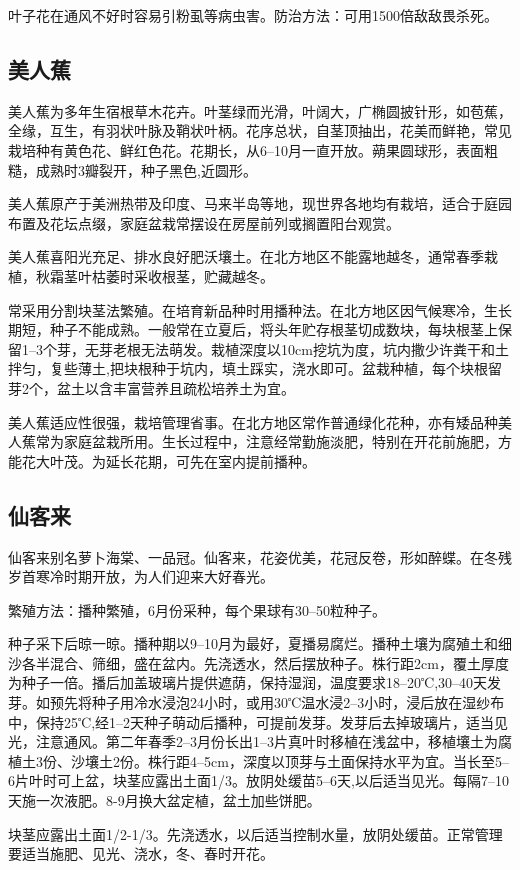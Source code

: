 \documentclass{ctexbook}
\begin{document}
叶子花在通风不好时容易引粉虱等病虫害。防治方法：可用1500倍敌敌畏杀死。
\subsection{美人蕉}
美人蕉为多年生宿根草木花卉。叶茎绿而光滑，叶阔大，广椭圆披针形，如苞蕉，全缘，互生，有羽状叶脉及鞘状叶柄。花序总状，自茎顶抽出，花美而鲜艳，常见栽培种有黄色花、鲜红色花。花期长，从6--10月一直开放。蒴果圆球形，表面粗糙，成熟时3瓣裂开，种子黑色,近圆形。

美人蕉原产于美洲热带及印度、马来半岛等地，现世界各地均有栽培，适合于庭园布置及花坛点缀，家庭盆栽常摆设在房屋前列或搁置阳台观赏。

美人蕉喜阳光充足、排水良好肥沃壤土。在北方地区不能露地越冬，通常春季栽植，秋霜茎叶枯萎时采收根茎，贮藏越冬。

常采用分割块茎法繁殖。在培育新品种时用播种法。在北方地区因气候寒冷，生长期短，种子不能成熟。一般常在立夏后，将头年贮存根茎切成数块，每块根茎上保留1--3个芽，无芽老根无法萌发。栽植深度以10cm挖坑为度，坑内撒少许粪干和土拌匀，复些薄土,把块根种于坑内，填土踩实，浇水即可。盆栽种植，每个块根留芽2个，盆土以含丰富营养且疏松培养土为宜。

美人蕉适应性很强，栽培管理省事。在北方地区常作普通绿化花种，亦有矮品种美人蕉常为家庭盆栽所用。生长过程中，注意经常勤施淡肥，特别在开花前施肥，方能花大叶茂。为延长花期，可先在室内提前播种。
\subsection{仙客来}
仙客来别名萝卜海棠、一品冠。仙客来，花姿优美，花冠反卷，形如醉蝶。在冬残岁首寒冷时期开放，为人们迎来大好春光。

繁殖方法：播种繁殖，6月份采种，每个果球有30--50粒种子。

种子采下后晾一晾。播种期以9--10月为最好，夏播易腐烂。播种土壤为腐殖土和细沙各半混合、筛细，盛在盆内。先浇透水，然后摆放种子。株行距2cm，覆土厚度为种子一倍。播后加盖玻璃片提供遮荫，保持湿润，温度要求18--20℃,30--40天发芽。如预先将种子用冷水浸泡24小时，或用30℃温水浸2--3小时，浸后放在湿纱布中，保持25℃,经1--2天种子萌动后播种，可提前发芽。发芽后去掉玻璃片，适当见光，注意通风。第二年春季2--3月份长出1--3片真叶时移植在浅盆中，移植壤土为腐植土3份、沙壤土2份。株行距4--5cm，深度以顶芽与土面保持水平为宜。当长至5--6片叶时可上盆，块茎应露出土面1/3。放阴处缓苗5--6天,以后适当见光。每隔7--10天施一次液肥。8-9月换大盆定植，盆土加些饼肥。

块茎应露出土面1/2-1/3。先浇透水，以后适当控制水量，放阴处缓苗。正常管理要适当施肥、见光、浇水，冬、春时开花。
\end{document}

